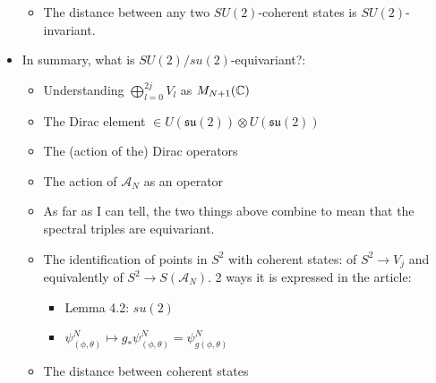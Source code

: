 \documentclass{article}
\newcommand{\sut}{\ensuremath{\mathfrak{su}(2)}}
\begin{document}
\begin{itemize}
\begin{itemize}
        \item The distance between any two $SU(2)$-coherent states is $SU(2)$-invariant.
            
        \end{itemize}
    
    
    
    
    
    \item In summary, what is $SU(2)/su(2)$-equivariant?:
    
        \begin{itemize}
            
        \item Understanding $\bigoplus_{l = 0}^{2j} V_l$ as $M_{N+1}(\mathbb{C})$
        
        \item The Dirac element $\in U(\sut) \otimes U(\sut)$
        
        \item The (action of the) Dirac operators
        
        \item The action of $\mathcal A_N$ as an operator

        \item As far as I can tell, the two things above combine to mean that the spectral triples are equivariant.
        
        \item The identification of points in $S^2$ with coherent states: of $S^2 \to V_j$ and equivalently of $S^2 \to S(\mathcal A_N)$. 2 ways it is expressed in the article:
        
            \begin{itemize}
                
            \item Lemma 4.2: $su(2)$
            
            \item $\psi^N_{(\phi, \theta)} \mapsto g_* \psi^N_{(\phi, \theta)} = \psi^N_{g(\phi, \theta)}$    
            
            \end{itemize}
        
        \item The distance between coherent states
            
        \end{itemize}
    
    \end{itemize}
\end{document}
